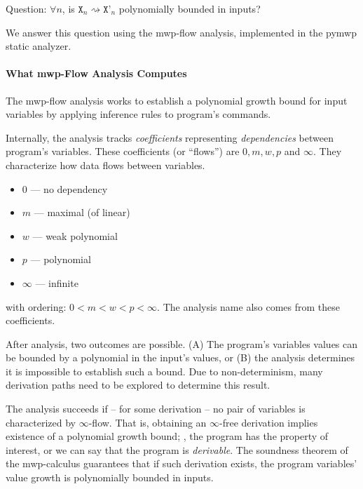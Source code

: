 Question: \(\forall n\), is \(\texttt{X}_n \rightsquigarrow \texttt{X'}_n\) polynomially bounded in inputs?

We answer this question using the mwp-flow analysis, implemented in the pymwp static analyzer.

\paragraph*{What mwp-Flow Analysis Computes}

The mwp-flow analysis works to establish a polynomial growth bound for input variables by applying inference rules to program's commands.

Internally, the analysis tracks \emph{coefficients} representing \emph{dependencies} between program's variables.
These coefficients (or \enquote{flows}) are \(0, m, w, p\) and \(\infty\).
They characterize how data flows between variables.

\begin{itemize}
\item \(0\) --- no dependency
\item \(m\) --- maximal (of linear)
\item \(w\) --- weak polynomial
\item \(p\) --- polynomial
\item \(\infty\) --- infinite
\end{itemize}

with ordering: \(0 < m < w < p < \infty\).
The analysis name also comes from these coefficients.

After analysis, two outcomes are possible.
(A) The program's variables values can be bounded by a polynomial in the input's values, or (B) the analysis determines it is impossible to establish such a bound.
Due to non-determinism, many derivation paths need to be explored to determine this result.

The analysis succeeds if -- for some derivation -- no pair of variables is characterized by \(\infty\)-flow.
That is, obtaining an \(\infty\)-free derivation implies existence of a polynomial growth bound;
\ie, the program has the property of interest, or we can say that the program is \emph{derivable}.
The soundness theorem of the mwp-calculus guarantees that if such derivation exists, the program variables' value growth is polynomially bounded in inputs.

